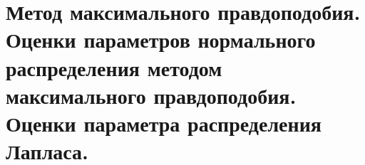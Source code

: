 \documentclass[polytech/stats/exam-2023/stats-exam-2023.tex]{subfiles}
\begin{document}
\section{Метод максимального правдоподобия. Оценки параметров нормального распределения методом максимального правдоподобия. Оценки параметра распределения Лапласа.}
\end{document}
